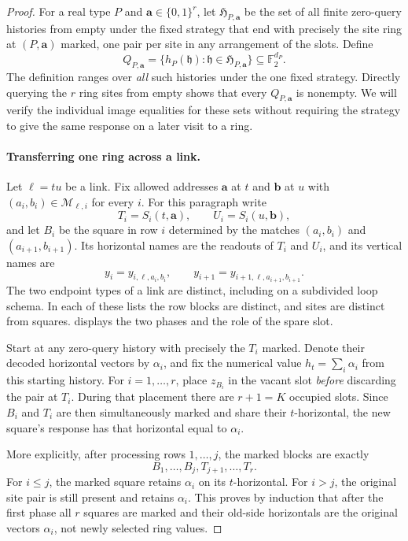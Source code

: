 \documentclass[11pt]{article}
\theoremstyle{definition}
\newcommand{\F}{\mathbb F_2}
\newcommand{\cM}{\mathcal M}
\begin{document}
\begin{proof}
For a real type $P$ and $\mathbf a\in\{0,1\}^r$, let
$\mathfrak H_{P,\mathbf a}$ be the set of all finite zero-query histories
from empty under the fixed strategy that end with precisely the site ring
at $(P,\mathbf a)$ marked, one pair per site in any arrangement of the
slots.  Define
\begin{equation}
\label{uniform:attained-sets}
 Q_{P,\mathbf a}
 =\{h_P(\mathfrak h):\mathfrak h\in\mathfrak H_{P,\mathbf a}\}
 \subseteq\F^{d_P}.
\end{equation}
The definition ranges over \emph{all} such histories under the one fixed
strategy.  Directly querying the $r$ ring sites from empty shows that
every $Q_{P,\mathbf a}$ is nonempty.  We will verify the individual image
equalities for these sets without requiring the strategy to give the same
response on a later visit to a ring.

\paragraph{Transferring one ring across a link.}
Let $\ell=tu$ be a link.  Fix allowed addresses $\mathbf a$ at $t$ and
$\mathbf b$ at $u$ with
$(a_i,b_i)\in\cM_{\ell,i}$ for every $i$.  For this paragraph write
\[
 T_i=S_i(t,\mathbf a),\qquad U_i=S_i(u,\mathbf b),
\]
and let $B_i$ be the square in row $i$ determined by the matches
$(a_i,b_i)$ and $(a_{i+1},b_{i+1})$.  Its horizontal names are the readouts
of $T_i$ and $U_i$, and its vertical names are
\[
 y_i=y_{i,\ell,a_i,b_i},\qquad
 y_{i+1}=y_{i+1,\ell,a_{i+1},b_{i+1}}.
\]
The two endpoint types of a link are distinct, including on a subdivided
loop schema.  In each of these lists the row blocks are distinct, and sites
are distinct from squares.
 displays the two phases and the role of
the spare slot.

Start at any zero-query history with precisely the $T_i$ marked.  Denote
their decoded horizontal vectors by $\alpha_i$, and fix the numerical
value $h_t=\sum_i\alpha_i$ from this starting history.  For
$i=1,\ldots,r$, place $z_{B_i}$ in the vacant slot \emph{before}
discarding the pair at $T_i$.  During that placement there are $r+1=K$
occupied slots.  Since $B_i$ and $T_i$ are then simultaneously marked and
share their $t$-horizontal, the new square's response has that horizontal
equal to $\alpha_i$.

More explicitly, after processing rows $1,\ldots,j$, the marked blocks are
exactly
\[
 B_1,\ldots,B_j,T_{j+1},\ldots,T_r.
\]
For $i\leq j$, the marked square retains $\alpha_i$ on its
$t$-horizontal.  For $i>j$, the original site pair is still present and
retains $\alpha_i$.  This proves by induction that after the first phase
all $r$ squares are marked and their old-side horizontals are the original
vectors $\alpha_i$, not newly selected ring values.


\end{proof}
\end{document}
